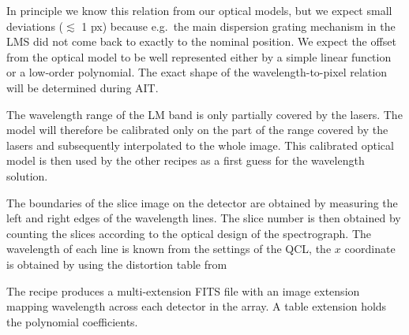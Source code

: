 In principle we know this relation from our optical models, but we expect small
deviations ($\lesssim$ 1 px) because e.g.\ the main dispersion grating mechanism
in the \ac{LMS} did not come back to exactly to the nominal position.
We expect the offset from the optical model to be well represented either by a
simple linear function or a low-order polynomial.
The exact shape of the wavelength-to-pixel relation will be determined during
\ac{AIT}.

The wavelength range of the LM band is only partially covered by the lasers.
The model will therefore be calibrated only on the part of the range covered by
the lasers and subsequently interpolated to the whole image.
This calibrated optical model is then used by the other recipes as a first
guess for the wavelength solution.

The boundaries of the slice image on the detector are obtained by
measuring the left and right edges of the wavelength lines.
The slice number is then obtained by counting the
slices according to the optical design of the spectrograph.
The wavelength of each line is known from the settings of the \ac{QCL}, the $x$
coordinate is obtained by
using the distortion table from \hyperref[rec:metis_ifu_distortion]{}

The recipe produces a multi-extension FITS file with an image
extension mapping wavelength across each detector in the array.
A table extension holds the polynomial coefficients.

